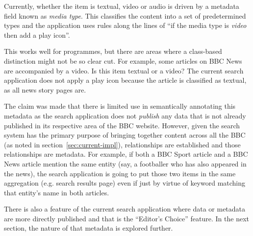Currently, whether the item is textual, video or audio is driven by
a metadata field known as \emph{media type}. This classifies the content
into a set of predetermined types and the application uses rules
along the lines of ``if the media type is \emph{video} then add a play icon''.

This works well for programmes, but there are areas where
a class-based distinction might not be so clear cut. For example, some articles
on BBC News are accompanied by a video. Is this item textual or a video?
The current search application does not apply a play icon because the
article is classified as textual, as all news story pages are.

The claim was made that there is limited use in semantically annotating
this metadata as the search application does not \emph{publish} any data
that is not already published in its respective area of the BBC website.
However, given the search system has the primary purpose of bringing
together content across all the BBC (as noted in section~\ref{sec:current-impl}),
relationships are established and those relationships are metadata.
For example, if both a BBC Sport article and a BBC News article mention
the same entity (say, a footballer who has also appeared in the news),
the search application is going to put those two items in the same aggregation
(e.g. search results page) even if just by virtue of keyword matching that
entity's name in both articles.

There is also a feature of the current search application where data or metadata
are more directly published and that is the ``Editor's Choice'' feature. In
the next section, the nature of that metadata is explored further.

